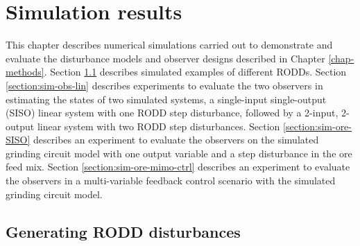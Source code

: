 \chapter{Simulation results}  \label{chap-simulation}

This chapter describes numerical simulations carried out to demonstrate and evaluate the disturbance models and observer designs described in Chapter \ref{chap-methods}. Section \ref{section:sim-RODDs} describes simulated examples of different \gls{RODD}s. Section \ref{section:sim-obs-lin} describes experiments to evaluate the two observers in estimating the states of two simulated systems, a single-input single-output (SISO) linear system with one \gls{RODD} step disturbance, followed by a 2-input, 2-output linear system with two \gls{RODD} step disturbances. Section \ref{section:sim-ore-SISO} describes an experiment to evaluate the observers on the simulated grinding circuit model with one output variable and a step disturbance in the ore feed mix. Section \ref{section:sim-ore-mimo-ctrl} describes an experiment to evaluate the observers in a multi-variable feedback control scenario with the simulated grinding circuit model.


\section{Generating \gls{RODD} disturbances} \label{section:sim-RODDs}

